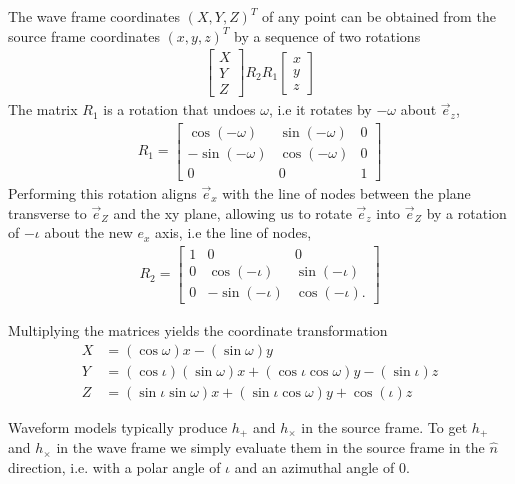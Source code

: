 \documentclass[aps,prd,amsmath,showpacs,amssymb,superscriptaddress,nofootinbib,longbibliography,eqsecnum,preprintnumbers]{revtex4-1}
\begin{document}
The wave frame coordinates $(X,Y,Z)^T$ of any point can be obtained from the source frame coordinates $(x,y,z)^T$ by a sequence of two rotations
\begin{align}
\begin{bmatrix}
X \\ Y \\ Z
\end{bmatrix}
R_2R_1
\begin{bmatrix}
x \\ y \\ z
\end{bmatrix}
\end{align}
The matrix $R_1$ is a rotation that undoes $\omega$, i.e it rotates by $-\omega$ about $\vec e_z$,
\begin{align}
R_1=
\begin{bmatrix}
\cos(- \omega) & \sin (-\omega) & 0\\
-\sin(-\omega) & \cos(- \omega) & 0 \\ 
0 & 0 & 1
\end{bmatrix}
\end{align}
Performing this rotation aligns $\vec e_x$ with the line of nodes between the plane transverse to $\vec e_Z$ and the xy plane, allowing us to rotate $\vec e_z$ into $\vec e_Z$ by a rotation of $-\iota$ about the new $e_x$ axis, i.e the line of nodes,
\begin{align}
R_2=
\begin{bmatrix}
1 & 0 & 0 \\
0 & \cos (-\iota) & \sin (-\iota) \\ 0 & -\sin (-\iota) &  \cos(-\iota).
\end{bmatrix}
\end{align}

Multiplying the matrices yields the coordinate transformation
\begin{align}
X&=(\cos \omega) x-(\sin \omega) y \nonumber \\
Y& =(\cos \iota) (\sin \omega) x +(\cos \iota \cos\omega)y-(\sin\iota)z \nonumber \\
Z&=(\sin \iota \sin \omega)x +(\sin \iota \cos \omega)y +\cos (\iota) z \label{eq:stoW}
\end{align}

Waveform models typically produce $h_+$ and $h_\times$ in the source frame. To get $h_+$ and $h_\times$ in the wave frame we simply evaluate them in the source frame in the $\hat n$ direction, i.e. with a polar angle of $\iota$ and an azimuthal angle of $0$.
\end{document}

